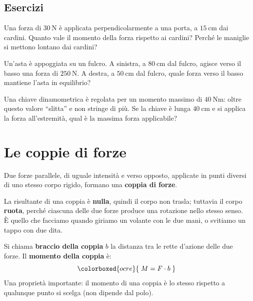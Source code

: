 \subsection{Esercizi}

\begin{esercizio}
Una forza di $\SI{30}{\newton}$ è applicata perpendicolarmente a una porta, a $\SI{15}{\centi\meter}$ dai cardini. Quanto vale il momento della forza rispetto ai cardini? Perché le maniglie si mettono lontano dai cardini?\\
\end{esercizio}

\begin{esercizio}
Un'asta è appoggiata su un fulcro. A sinistra, a $\SI{80}{\centi\meter}$ dal fulcro, agisce verso il basso una forza di $\SI{250}{\newton}$. A destra, a $\SI{50}{\centi\meter}$ dal fulcro, quale forza verso il basso mantiene l'asta in equilibrio?\\
\end{esercizio}

\begin{esercizio}
Una chiave dinamometrica è regolata per un momento massimo di $\SI{40}{\newton\meter}$: oltre questo valore ``slitta'' e non stringe di più. Se la chiave è lunga $\SI{40}{\centi\meter}$ e si applica la forza all'estremità, qual è la massima forza applicabile?\\
\end{esercizio}


\section{Le coppie di forze}\label{sec:coppie}

\begin{definizione}
Due forze parallele, di uguale intensità e verso opposto, applicate in punti diversi di uno stesso corpo rigido, formano una \textbf{coppia di forze}.
\end{definizione}

La risultante di una coppia è \textbf{nulla}, quindi il corpo non trasla; tuttavia il corpo \textbf{ruota}, perché ciascuna delle due forze produce una rotazione nello stesso senso. È quello che facciamo quando giriamo un volante con le due mani, o svitiamo un tappo con due dita.

Si chiama \textbf{braccio della coppia} $b$ la distanza tra le rette d'azione delle due forze. Il \textbf{momento della coppia} è:
\[
\colorboxed{ocre}{\; M = F\cdot b \;}
\]
Una proprietà importante: il momento di una coppia è lo stesso rispetto a qualunque punto si scelga (non dipende dal polo).

